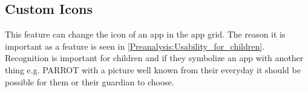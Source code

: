 \subsection{Custom Icons}
\label{backlog:custom_icons}

This feature can change the icon of an app in the app grid. The reason it is important as a feature is seen in \autoref{Preanalysis:Usability_for_children}. Recognition is important for children and if they symbolize an app with another thing e.g. PARROT with a picture well known from their everyday it should be possible for them or their guardian to choose.